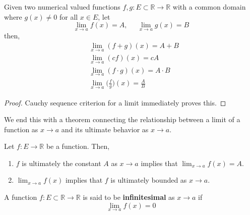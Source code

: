   \begin{theorem}
    Given two numerical valued functions $f, g: E \subset \mathbb{R} \longrightarrow \mathbb{R}$ with a common domain where $g(x) \neq 0$ for all $x \in E$, let 
    \begin{equation}
      \lim_{x \rightarrow a} f(x) = A, \;\;\;\;\; \lim_{x \rightarrow a} g(x) = B
    \end{equation}
    then, 
    \begin{align*}
      & \lim_{x \rightarrow a} (f+g)(x) = A + B \\
      & \lim_{x \rightarrow a} (cf)(x) = cA \\
      & \lim_{x \rightarrow a} (f \cdot g)(x) = A \cdot B \\
      & \lim_{x \rightarrow a} \bigg(\frac{f}{g}\bigg) (x) = \frac{A}{B}
    \end{align*}
  \end{theorem}
  \begin{proof}
    Cauchy sequence criterion for a limit immediately proves this. 
  \end{proof}

  We end this with a theorem connecting the relationship between a limit of a function as $x \rightarrow a$ and its ultimate behavior as $x \rightarrow a$. 

  \begin{theorem}
    Let $f: E \longrightarrow \mathbb{R}$ be a function. Then, 
    \begin{enumerate}
      \item $f$ is ultimately the constant $A$ as $x \rightarrow a$ implies that $\lim_{x \rightarrow a} f(x) = A$. 
      \item $\lim_{x \rightarrow a} f(x)$ implies that $f$ is ultimately bounded as $x \rightarrow a$. 
    \end{enumerate}
  \end{theorem}

  \begin{definition}
    A function $f: E \subset \mathbb{R} \longrightarrow \mathbb{R}$ is said to be \textbf{infinitesimal} as $x \rightarrow a$ if 
    \[\lim_{x \rightarrow a} f(x) = 0\]
  \end{definition}

